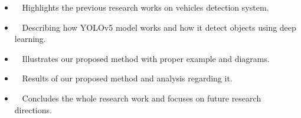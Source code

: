    \begin{itemize}
       
       \item\textbf{~}  Highlights the previous research works on vehicles detection system.
       
        \item\textbf{~} Describing how YOLOv5 model works and how it detect objects using deep learning. 
       
        \item\textbf{~} Illustrates our proposed method with proper example and diagrams. 
       
       \item\textbf{~} Results of our proposed method and analysis regarding it.
       
       \item\textbf{~} Concludes the whole research work and focuses on future research directions.
       
       
       
   \end{itemize}




























 
